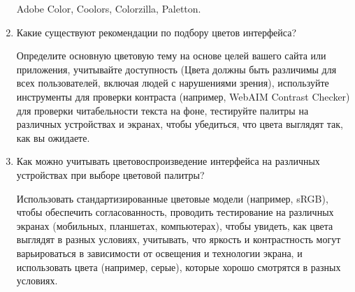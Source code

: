 \begin{enumerate}
Adobe Color, Coolors, Colorzilla, Paletton.
    \item Какие существуют рекомендации по подбору цветов интерфейса?

        Определите основную цветовую тему на основе целей вашего сайта или приложения, учитывайте доступность (Цвета должны быть различимы для всех пользователей, включая людей с нарушениями зрения), используйте инструменты для проверки контраста (например, WebAIM Contrast Checker) для проверки читабельности текста на фоне, тестируйте палитры на различных устройствах и экранах, чтобы убедиться, что цвета выглядят так, как вы ожидаете.
    \item Как можно учитывать цветовоспроизведение интерфейса на различных устройствах при выборе цветовой палитры?

Использовать стандартизированные цветовые модели (например, sRGB), чтобы обеспечить согласованность, проводить тестирование на различных экранах (мобильных, планшетах, компьютерах), чтобы увидеть, как цвета выглядят в разных условиях, учитывать, что яркость и контрастность могут варьироваться в зависимости от освещения и технологии экрана, и использовать цвета (например, серые), которые хорошо смотрятся в разных условиях.
\end{enumerate}


